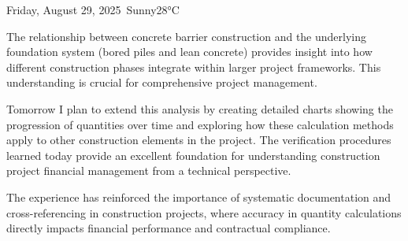 \begin{dailyentry}{Friday, August 29, 2025}{\weathersunny\ Sunny}{28°C}
\begin{dailynotes}
The relationship between concrete barrier construction and the underlying foundation system (bored piles and lean concrete) provides insight into how different construction phases integrate within larger project frameworks. This understanding is crucial for comprehensive project management.

Tomorrow I plan to extend this analysis by creating detailed charts showing the progression of quantities over time and exploring how these calculation methods apply to other construction elements in the project. The verification procedures learned today provide an excellent foundation for understanding construction project financial management from a technical perspective.

The experience has reinforced the importance of systematic documentation and cross-referencing in construction projects, where accuracy in quantity calculations directly impacts financial performance and contractual compliance.
\end{dailynotes}

\begin{approvalsection}
\end{approvalsection}

\end{dailyentry}
